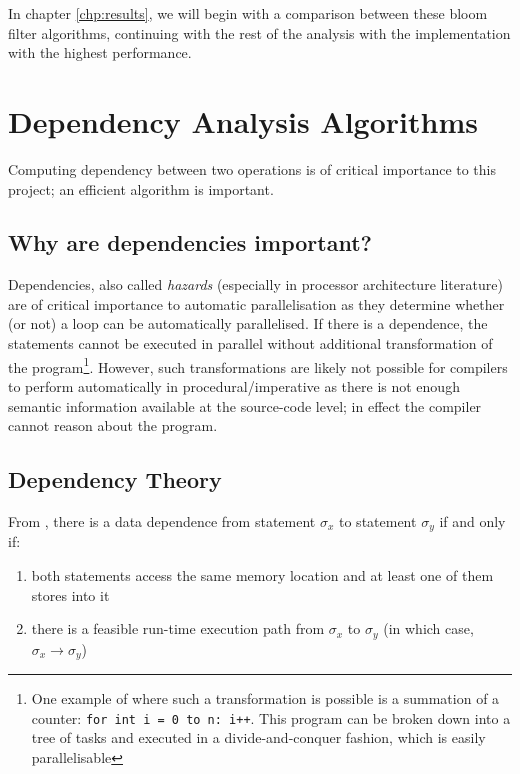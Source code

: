 	In chapter \ref{chp:results}, we will begin with a comparison between these bloom filter algorithms, continuing with the rest of the analysis with the implementation with the highest performance.

\section{Dependency Analysis Algorithms} \label{sec:runtime/analysis}
	Computing dependency between two operations is of critical importance to this project; an efficient algorithm is important.
	
	\subsection{Why are dependencies important?} \label{runtime/analysis/why}
	Dependencies, also called \textit{hazards} (especially in processor architecture literature) are of critical importance to automatic parallelisation as they determine whether (or not) a loop can be automatically parallelised. If there is a dependence, the statements cannot be executed in parallel without additional transformation of the program\footnote{One example of where such a transformation is possible is a summation of a counter: \texttt{for int i = 0 to n: i++}. This program can be broken down into a tree of tasks and executed in a divide-and-conquer fashion, which is easily parallelisable}. However, such transformations are likely not possible for compilers to perform automatically in procedural/imperative as there is not enough semantic information available at the source-code level; in effect the compiler cannot reason about the program. 
	
	\subsection{Dependency Theory} \label{sec:runtime/analysis/theory}
	From \citet[p.~37]{Allen2000}, there is a data dependence from statement $\sigma_x$ to statement $\sigma_y$ if and only if:
	
	\begin{enumerate}
		\item both statements access the same memory location and at least one of them stores into it
		\item there is a feasible run-time execution path from $\sigma_x$ to $\sigma_y$ (in which case, $\sigma_x \rightarrow \sigma_y$)
	\end{enumerate}
	

